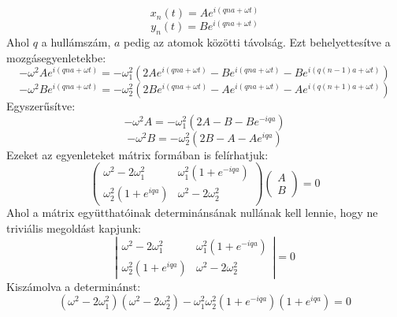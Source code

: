 \documentclass[../main.tex]{subfiles}
\begin{document}
\begin{equation}
    x_n(t) = A e^{i (q n a + \omega t)}
\end{equation}
\begin{equation}
    y_n(t) = B e^{i (q n a + \omega t)}
\end{equation}
Ahol $q$ a hullámszám, $a$ pedig az atomok közötti távolság. Ezt behelyettesítve a mozgásegyenletekbe:
\begin{equation}
    -\omega^2 A e^{i (q n a + \omega t)} = -\omega_1^2 \left( 2A e^{i (q n a + \omega t)} - B e^{i (q n a + \omega t)} - B e^{i (q (n-1) a + \omega t)} \right)
\end{equation}
\begin{equation}
    -\omega^2 B e^{i (q n a + \omega t)} = -\omega_2^2 \left( 2B e^{i (q n a + \omega t)} - A e^{i (q n a + \omega t)} - A e^{i (q (n+1) a + \omega t)} \right)
\end{equation}
Egyszerűsítve:
\begin{equation}
    -\omega^2 A = -\omega_1^2 \left( 2A - B - B e^{-i q a} \right)
\end{equation}
\begin{equation}
    -\omega^2 B = -\omega_2^2 \left( 2B - A - A e^{i q a} \right)
\end{equation}
Ezeket az egyenleteket mátrix formában is felírhatjuk:
\begin{equation}
    \begin{pmatrix}
    \omega^2 - 2\omega_1^2 & \omega_1^2 (1 + e^{-i q a}) \\
    \omega_2^2 (1 + e^{i q a}) & \omega^2 - 2\omega_2^2
    \end{pmatrix}
    \begin{pmatrix}
    A \\
    B
    \end{pmatrix}
    = 0
\end{equation}
Ahol a mátrix együtthatóinak determinánsának nullának kell lennie, hogy ne triviális megoldást kapjunk:
\begin{equation}
    \left| \begin{matrix}
    \omega^2 - 2\omega_1^2 & \omega_1^2 (1 + e^{-i q a}) \\
    \omega_2^2 (1 + e^{i q a}) & \omega^2 - 2\omega_2^2
    \end{matrix} \right| = 0
\end{equation}
Kiszámolva a determinánst:
\begin{equation}
    (\omega^2 - 2\omega_1^2)(\omega^2 - 2\omega_2^2) - \omega_1^2 \omega_2^2 (1 + e^{-i q a})(1 + e^{i q a}) = 0
\end{equation}
\end{document}
